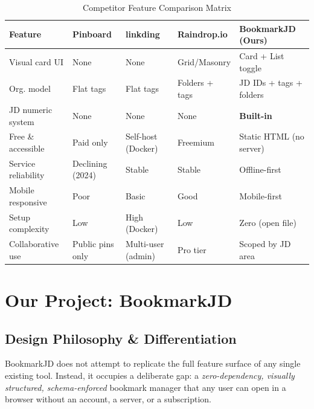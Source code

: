 \documentclass[11pt,a4paper]{book}
\begin{document}
\begin{table}[H]
\centering
\caption{Competitor Feature Comparison Matrix}
\label{tab:competitor-matrix}
\begin{tabular}{|p{3.8cm}|p{2.4cm}|p{2.4cm}|p{2.4cm}|p{3.2cm}|}
\hline
\textbf{Feature} & \textbf{Pinboard} & \textbf{linkding} & \textbf{Raindrop.io} & \textbf{BookmarkJD (Ours)} \\
\hline
Visual card UI         & None              & None              & Grid/Masonry         & Card + List toggle \\
\hline
Org. model             & Flat tags         & Flat tags         & Folders + tags       & JD IDs + tags + folders \\
\hline
JD numeric system      & None              & None              & None                 & \textbf{Built-in} \\
\hline
Free \& accessible     & Paid only         & Self-host (Docker)& Freemium             & Static HTML (no server) \\
\hline
Service reliability    & Declining (2024)  & Stable            & Stable               & Offline-first \\
\hline
Mobile responsive      & Poor              & Basic             & Good                 & Mobile-first \\
\hline
Setup complexity       & Low               & High (Docker)     & Low                  & Zero (open file) \\
\hline
Collaborative use      & Public pins only  & Multi-user (admin)& Pro tier             & Scoped by JD area \\
\hline
\end{tabular}
\end{table}
 
\section{Our Project: BookmarkJD}
 
\subsection{Design Philosophy \& Differentiation}
 
BookmarkJD does not attempt to replicate the full feature surface of any single existing tool. Instead, it occupies a deliberate gap: a \textit{zero-dependency, visually structured, schema-enforced} bookmark manager that any user can open in a browser without an account, a server, or a subscription.
 
\end{document}
